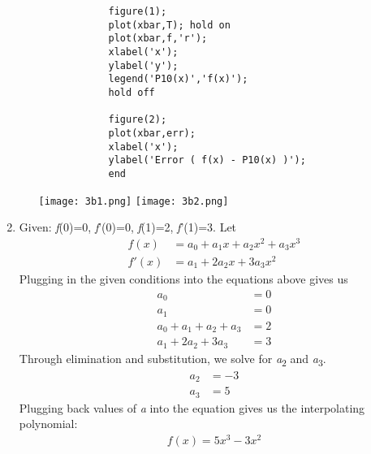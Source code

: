 \documentclass{article}
\begin{document}
\begin{enumerate}
\begin{enumerate}
\begin{lstlisting}
            figure(1);
            plot(xbar,T); hold on
            plot(xbar,f,'r');
            xlabel('x');
            ylabel('y');
            legend('P10(x)','f(x)');
            hold off

            figure(2);
            plot(xbar,err);
            xlabel('x');
            ylabel('Error ( f(x) - P10(x) )');
            end
            \end{lstlisting}
            \begin{center}
                \texttt{[image: 3b1.png]}
                \texttt{[image: 3b2.png]}
            \end{center}

        \end{enumerate}
    \item %
        Given: \textit{f}(0)=0, \textit{f}'(0)=0, \textit{f}(1)=2, \textit{f}'(1)=3. Let 
        \begin{align*}
            f(x) &= a_{0} + a_{1}x + a_{2}x^2 + a_{3}x^3 \\
            f'(x) &= a_{1} + 2a_{2}x + 3a_{3}x^2 
        \end{align*}    
        Plugging in the given conditions into the equations above gives us
        \begin{align*}
            a_{0} &= 0 \\
            a_{1} &= 0 \\
            a_{0} + a_{1} + a_{2} + a_{3} &= 2 \\
            a_{1} + 2a_{2} + 3a_{3} &= 3 
        \end{align*}
        Through elimination and substitution, we solve for \textit{a}\textsubscript{2} and \textit{a}\textsubscript{3}.
        \begin{align*}
            a_{2} &= -3 \\
            a_{3} &= 5
        \end{align*}
        Plugging back values of \textit{a} into the equation gives us the interpolating polynomial:
        \begin{align*}
            f(x) = 5x^3 -3x^2
        \end{align*}

\end{enumerate}
\end{document}

